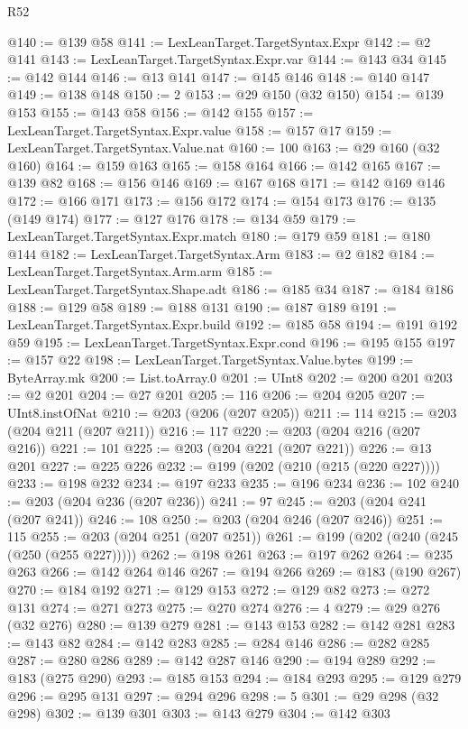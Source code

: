 \begin{lexlean}{R52}
\begin{coremodule}
@140 := @139 @58
@141 := LexLeanTarget.TargetSyntax.Expr
@142 := @2 @141
@143 := LexLeanTarget.TargetSyntax.Expr.var
@144 := @143 @34
@145 := @142 @144
@146 := @13 @141
@147 := @145 @146
@148 := @140 @147
@149 := @138 @148
@150 := 2
@153 := @29 @150 (@32 @150)
@154 := @139 @153
@155 := @143 @58
@156 := @142 @155
@157 := LexLeanTarget.TargetSyntax.Expr.value
@158 := @157 @17
@159 := LexLeanTarget.TargetSyntax.Value.nat
@160 := 100
@163 := @29 @160 (@32 @160)
@164 := @159 @163
@165 := @158 @164
@166 := @142 @165
@167 := @139 @82
@168 := @156 @146
@169 := @167 @168
@171 := @142 @169 @146
@172 := @166 @171
@173 := @156 @172
@174 := @154 @173
@176 := @135 (@149 @174)
@177 := @127 @176
@178 := @134 @59
@179 := LexLeanTarget.TargetSyntax.Expr.match
@180 := @179 @59
@181 := @180 @144
@182 := LexLeanTarget.TargetSyntax.Arm
@183 := @2 @182
@184 := LexLeanTarget.TargetSyntax.Arm.arm
@185 := LexLeanTarget.TargetSyntax.Shape.adt
@186 := @185 @34
@187 := @184 @186
@188 := @129 @58
@189 := @188 @131
@190 := @187 @189
@191 := LexLeanTarget.TargetSyntax.Expr.build
@192 := @185 @58
@194 := @191 @192 @59
@195 := LexLeanTarget.TargetSyntax.Expr.cond
@196 := @195 @155
@197 := @157 @22
@198 := LexLeanTarget.TargetSyntax.Value.bytes
@199 := ByteArray.mk
@200 := List.toArray.{0}
@201 := UInt8
@202 := @200 @201
@203 := @2 @201
@204 := @27 @201
@205 := 116
@206 := @204 @205
@207 := UInt8.instOfNat
@210 := @203 (@206 (@207 @205))
@211 := 114
@215 := @203 (@204 @211 (@207 @211))
@216 := 117
@220 := @203 (@204 @216 (@207 @216))
@221 := 101
@225 := @203 (@204 @221 (@207 @221))
@226 := @13 @201
@227 := @225 @226
@232 := @199 (@202 (@210 (@215 (@220 @227))))
@233 := @198 @232
@234 := @197 @233
@235 := @196 @234
@236 := 102
@240 := @203 (@204 @236 (@207 @236))
@241 := 97
@245 := @203 (@204 @241 (@207 @241))
@246 := 108
@250 := @203 (@204 @246 (@207 @246))
@251 := 115
@255 := @203 (@204 @251 (@207 @251))
@261 := @199 (@202 (@240 (@245 (@250 (@255 @227)))))
@262 := @198 @261
@263 := @197 @262
@264 := @235 @263
@266 := @142 @264 @146
@267 := @194 @266
@269 := @183 (@190 @267)
@270 := @184 @192
@271 := @129 @153
@272 := @129 @82
@273 := @272 @131
@274 := @271 @273
@275 := @270 @274
@276 := 4
@279 := @29 @276 (@32 @276)
@280 := @139 @279
@281 := @143 @153
@282 := @142 @281
@283 := @143 @82
@284 := @142 @283
@285 := @284 @146
@286 := @282 @285
@287 := @280 @286
@289 := @142 @287 @146
@290 := @194 @289
@292 := @183 (@275 @290)
@293 := @185 @153
@294 := @184 @293
@295 := @129 @279
@296 := @295 @131
@297 := @294 @296
@298 := 5
@301 := @29 @298 (@32 @298)
@302 := @139 @301
@303 := @143 @279
@304 := @142 @303

\end{coremodule}
\end{lexlean}
